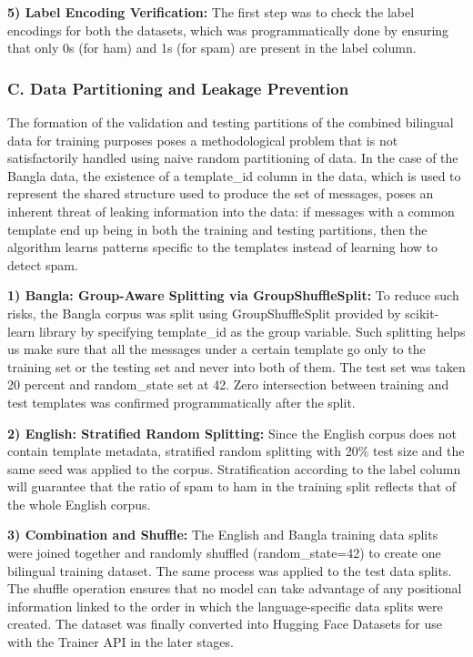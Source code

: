 \textbf{5) Label Encoding Verification:} The first step was to check the
label encodings for both the datasets, which was programmatically done
by ensuring that only 0s (for ham) and 1s (for spam) are present in the
label column.

\subsubsection{C. Data Partitioning and Leakage
Prevention}\label{c.-data-partitioning-and-leakage-prevention}

The formation of the validation and testing partitions of the combined
bilingual data for training purposes poses a methodological problem that
is not satisfactorily handled using naive random partitioning of data.
In the case of the Bangla data, the existence of a template\_id column
in the data, which is used to represent the shared structure used to
produce the set of messages, poses an inherent threat of leaking
information into the data: if messages with a common template end up
being in both the training and testing partitions, then the algorithm
learns patterns specific to the templates instead of learning how to
detect spam.

\textbf{1) Bangla: Group-Aware Splitting via GroupShuffleSplit:} To
reduce such risks, the Bangla corpus was split using GroupShuffleSplit
provided by scikit-learn library by specifying template\_id as the group
variable. Such splitting helps us make sure that all the messages under
a certain template go only to the training set or the testing set and
never into both of them. The test set was taken 20 percent and
random\_state set at 42. Zero intersection between training and test
templates was confirmed programmatically after the split.

\textbf{2) English: Stratified Random Splitting:} Since the English
corpus does not contain template metadata, stratified random splitting
with 20\% test size and the same seed was applied to the corpus.
Stratification according to the label column will guarantee that the
ratio of spam to ham in the training split reflects that of the whole
English corpus.

\textbf{3) Combination and Shuffle:} The English and Bangla training
data splits were joined together and randomly shuffled
(random\_state=42) to create one bilingual training dataset. The same
process was applied to the test data splits. The shuffle operation
ensures that no model can take advantage of any positional information
linked to the order in which the language-specific data splits were
created. The dataset was finally converted into Hugging Face Datasets
for use with the Trainer API in the later stages.


